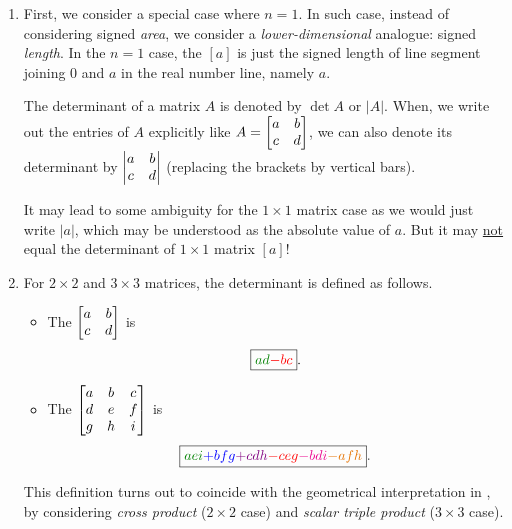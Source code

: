 \begin{enumerate}
\begin{center}
\begin{tikzpicture}
\end{tikzpicture}
\end{center}
\item First, we consider a special case where \(n=1\). In such case, instead of
considering signed \emph{area}, we consider a \emph{lower-dimensional}
analogue: signed \emph{length}. In the \(n=1\) case, the  \([a]\) is just the signed length of line segment joining
\(0\) and \(a\) in the real number line, namely \(\boxed{a}\).
\begin{center}
\end{center}
The determinant of a matrix \(A\) is denoted by \(\det A\) or \(|A|\).
When, we
write out the entries of \(A\) explicitly like \(A=\mqty[a&b\\ c&d]\), we can
also denote its determinant by \(\mqty|a&b\\ c&d|\) (replacing the brackets by
vertical bars).
\begin{warning}
It may lead to some ambiguity for the \(1\times 1\) matrix case as we would
just write \(|a|\), which may be understood as the absolute value of \(a\).
But it may \underline{not} equal the determinant of \(1\times 1\) matrix \([a]\)!
\end{warning}
\item For \(2\times 2\) and \(3\times 3\) matrices, the determinant is defined
as follows. 
\begin{itemize}
\item The  \(\mqty[a&b\\ c&d]\) is
\[
\boxed{\gc{ad}\rc{-bc}}.
\]
\item The  \(\mqty[a&b&c\\ d&e&f\\ g&h&i]\) is
\[
\boxed{\gc{aei}\blc{+bfg}\vc{+cdh}\rc{-ceg}\mgc{-bdi}\orc{-afh}}.
\]
\end{itemize}
This definition turns out to coincide with the geometrical
interpretation in , by considering \emph{cross product}
(\(2\times 2\) case) and \emph{scalar triple product} (\(3\times 3\) case).


\end{enumerate}
